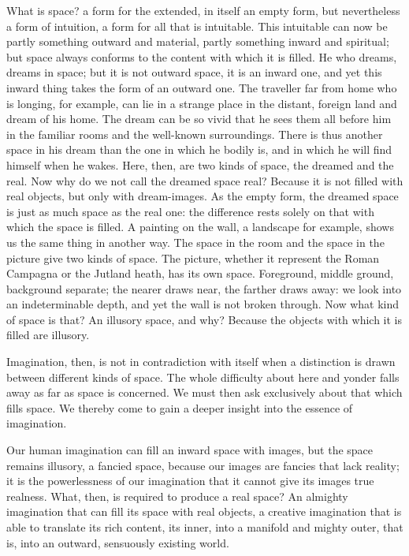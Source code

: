 \documentclass[12pt,a4paper,openany]{book}
\newcommand{\opage}[1]{\marginnote{\footnotesize\textit{[#1]}}}
\begin{document}
What is space? a form for the extended, in itself an empty form, but nevertheless a form of intuition, a form for all
that is intuitable. This intuitable can now be partly something outward and material, partly something inward and
spiritual; but space always conforms to the content with which it is filled. He who dreams, dreams in space; but it is
not outward space, it is an inward one, and yet this inward thing takes the form of an outward one. The traveller far
from home who is longing, for example, can lie in a strange place in the distant, foreign land and dream of his home.
The dream can be so vivid that he sees them all before him in the familiar rooms and the well-known surroundings. There
is thus another space in his dream than the one in which he bodily is, and in which he will find himself when he wakes.
Here, then, are two kinds of space, the dreamed and the real. Now why do we not call the dreamed space real? Because it
is not filled with real objects, but only with dream-images. As the empty form, the dreamed space is just as much space
as the real one: the difference rests solely on that with which the space is filled. A painting on the wall, a
landscape for example, shows us the same thing in another way. The space in the room and the space in the picture give
two kinds of space. The picture, whether it represent the Roman Campagna or the Jutland heath, has its own space.
Foreground, middle ground, background separate; the nearer draws near, the farther draws away: we look into an
indeterminable depth, and yet the wall is not broken through. Now what kind of space is that? An
\setcounter{footnote}{0}%
\opage{22}illusory space, and why? Because the objects with which it is filled are illusory.

Imagination, then, is not in contradiction with itself when a distinction is drawn between different kinds of space.
The whole difficulty about here and yonder falls away as far as space is concerned. We must then ask exclusively about
that which fills space. We thereby come to gain a deeper insight into the essence of imagination.

Our human imagination can fill an inward space with images, but the space remains illusory, a fancied space, because
our images are fancies that lack reality; it is the powerlessness of our imagination that it cannot give its images
true realness. What, then, is required to produce a real space? An almighty imagination that can fill its space with
real objects, a creative imagination that is able to translate its rich content, its inner, into a manifold and mighty
outer, that is, into an outward, sensuously existing world.
\end{document}
